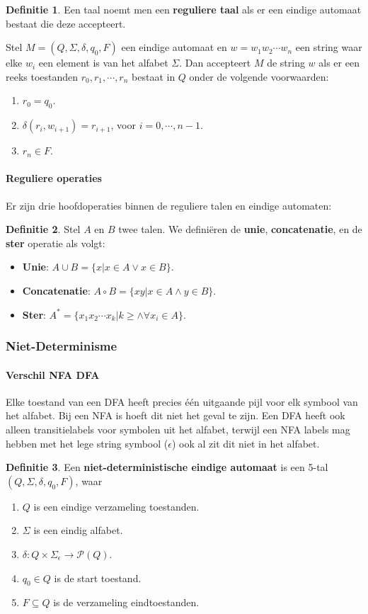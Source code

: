 \documentclass[12pt,a4paper]{article}
\theoremstyle{definition}
\newtheorem{defi}{Definitie}[section]
\newcommand{\ra}{\ensuremath{\rightarrow}}
\newcommand{\NFA}{\ensuremath{(Q,\Sigma,\delta,q_0,F)}}
\begin{document}
	\begin{defi}
		Een taal noemt men een \textbf{reguliere taal} als er een eindige automaat bestaat die deze accepteert.
	\end{defi}
	Stel $M = \NFA$ een eindige automaat en $w=w_1w_2\cdots w_n$ een string waar elke $w_i$ een element is van het alfabet $\Sigma$. Dan accepteert $M$ de string $w$ als er een reeks toestanden $r_0,r_1,\cdots,r_n$ bestaat in $Q$ onder de volgende voorwaarden:
	\begin{enumerate}
		\item $r_0 = q_0$.
		\item $\delta(r_i,w_{i+1})=r_{i+1}$, voor $i=0,\cdots,n-1$.
		\item $r_n \in F$.
	\end{enumerate} 
	\paragraph{Reguliere operaties}
	Er zijn drie hoofdoperaties binnen de reguliere talen en eindige automaten:
	\begin{defi}
		Stel $A$ en $B$ twee talen. We definiëren de \textbf{unie}, \textbf{concatenatie}, en de \textbf{ster} operatie als volgt:
		\begin{itemize}
			\item \textbf{Unie}: $A\cup B=\{x|x\in A \vee x\in B\}$.
			\item \textbf{Concatenatie}: $A\circ B = \{xy|x\in A \wedge y \in B\}$.
			\item \textbf{Ster}: $A^*=\{x_1 x_2\cdots x_k | k\geq \wedge \forall x_i\in A\}$.
		\end{itemize}
	\end{defi}
	\subsubsection{Niet-Determinisme}
	\paragraph{Verschil NFA DFA}
	Elke toestand van een DFA heeft precies één uitgaande pijl voor elk symbool van het alfabet. Bij een NFA is hoeft dit niet het geval te zijn. Een DFA heeft ook alleen transitielabels voor symbolen uit het alfabet, terwijl een NFA labels mag hebben met het lege string symbool ($\epsilon$) ook al zit dit niet in het alfabet.
	\begin{defi}
		Een \textbf{niet-deterministische eindige automaat} is een 5-tal\\ $\NFA$, waar
		\begin{enumerate}
			\item $Q$ is een eindige verzameling toestanden.
			\item $\Sigma$ is een eindig alfabet.
			\item $\delta : Q\times \Sigma_\epsilon \ra \mathcal{P}(Q)$.
			\item $q_0 \in Q$ is de start toestand.
			\item $F \subseteq Q$ is de verzameling eindtoestanden.
		\end{enumerate}
	\end{defi}
	
\end{document}
